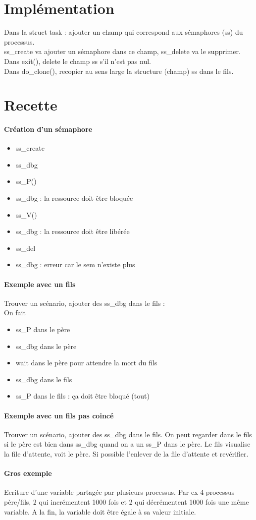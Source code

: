 \documentclass[12pt]{article}
\begin{document}
\newpage
\section{Implémentation}
Dans la struct task : ajouter un champ qui correspond aux sémaphores (ss) du processus. \\
ss\_create va ajouter un sémaphore dans ce champ, ss\_delete va le supprimer. \\
Dans exit(), delete le champ ss s'il n'est pas nul. \\
Dans do\_clone(), recopier au sens large la structure (champ) ss dans le fils.

\newpage
\section{Recette}
\paragraph{Création d'un sémaphore}
\begin{itemize}
  \item ss\_create
  \item ss\_dbg
  \item ss\_P()
  \item ss\_dbg : la ressource doit être bloquée
  \item ss\_V()
  \item ss\_dbg : la ressource doit être libérée
  \item ss\_del
  \item ss\_dbg : erreur car le sem n'existe plus
\end{itemize}

\paragraph{Exemple avec un fils}
Trouver un scénario, ajouter des ss\_dbg dans le fils : \\
On fait
\begin{itemize}
  \item ss\_P dans le père
  \item ss\_dbg dans le père
  \item wait dans le père pour attendre la mort du fils
  \item ss\_dbg dans le fils
  \item ss\_P dans le fils : ça doit être bloqué (tout)
\end{itemize}

\paragraph{Exemple avec un fils pas coincé}
Trouver un scénario, ajouter des ss\_dbg dans le fils. On peut regarder dans le fils si le père est bien dans ss\_dbg quand on a un ss\_P dans le père. Le fils visualise la file d'attente, voit le père. Si possible l'enlever de la file d'attente et revérifier.

\paragraph{Gros exemple}
Ecriture d'une variable partagée par plusieurs processus. Par ex 4 processus père/fils, 2 qui incrémentent 1000 fois et 2 qui décrémentent 1000 fois une même variable. A la fin, la variable doit être égale à sa valeur initiale.
\end{document}
